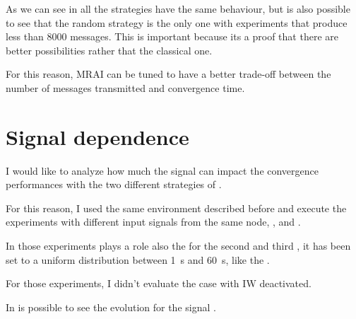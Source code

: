 As we can see in  all the strategies have the same
behaviour, but is also possible to see that the random strategy is the only
one with experiments that produce less than \num{8000} messages.
This is important because its a proof that there are better possibilities rather
that the classical one.

For this reason, \ac{MRAI} can be tuned to have a better trade-off between 
the number of messages transmitted and convergence time.

\section{Signal dependence}
\label{sec:bgp_mrai_signal_dependance}

I would like to analyze how much the signal can impact the convergence performances
with the two different strategies of .

For this reason, I used the same environment described before and execute the
experiments with different input signals from the same node, , 
and .

In those experiments plays a role also the 
for the second and third , it has been set to a uniform distribution
between \SI{1}{\second} and \SI{60}{\second}, like the .

For those experiments, I didn't evaluate the case with \ac{IW} deactivated.


In  is possible to see the evolution
for the signal .

